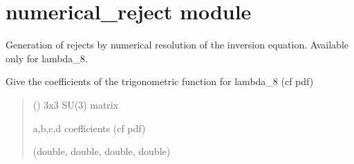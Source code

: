 \documentclass[letterpaper,10pt,english]{sphinxmanual}
\begin{document}
\section{numerical\_reject module}
\label{\detokenize{numerical_reject:module-numerical_reject}}\label{\detokenize{numerical_reject:numerical-reject-module}}\label{\detokenize{numerical_reject::doc}}
\sphinxAtStartPar
Generation of rejects by numerical resolution of the inversion equation. Available only for lambda\_8.

\begin{fulllineitems}
\label{\detokenize{numerical_reject:numerical_reject.coeffs_8}}
\pysigstartsignatures
\pysiglinewithargsret
{}
{}
{}
\pysigstopsignatures
\sphinxAtStartPar
Give the coefficients of the trigonometric function for lambda\_8 (cf pdf)
\begin{quote}\begin{description}
\sphinxAtStartPar
{} () \textendash{} 3x3 SU(3) matrix

\sphinxAtStartPar
a,b,c,d coefficients (cf pdf)

\sphinxAtStartPar
(double, double, double, double)

\end{description}\end{quote}

\end{fulllineitems}

\end{document}
